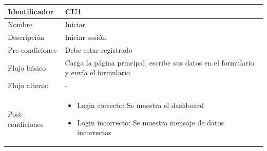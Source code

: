 \vspace{1em}
\par
\begin{tabular}{||p{3cm}|p{11cm}||} 
\hline
Identificador & CU1 \\ [0.5ex] 
\hline\hline
Nombre & Iniciar \\ 
\hline
Descripción & Iniciar sesión \\
\hline
Pre-condiciones & Debe estar registrado \\
\hline
Flujo básico & Carga la página principal, escribe sus datos en el formulario
y envía el formulario \\
\hline
Flujo alterno & - \\
\hline
Post-condiciones &
\begin{itemize}
    \item Login correcto: Se muestra el dashboard
    \item Login incorrecto: Se muestra mensaje de datos incorrectos
\end{itemize} \\
\hline
\end{tabular}
